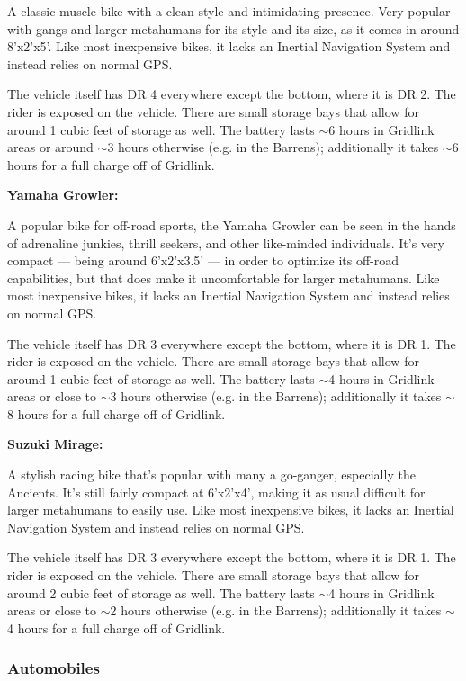 A classic muscle bike with a clean style and intimidating presence. Very popular with gangs and larger metahumans for its style and its size, as it comes in around 8'x2'x5'. Like most inexpensive bikes, it lacks an Inertial Navigation System and instead relies on normal GPS.

The vehicle itself has DR 4 everywhere except the bottom, where it is DR 2. The rider is exposed on the vehicle. There are small storage bays that allow for around 1 cubic feet of storage as well. The battery lasts $\sim$6 hours in Gridlink areas or around $\sim$3 hours otherwise (e.g. in the Barrens); additionally it takes $\sim$6 hours for a full charge off of Gridlink.

\textbf{Yamaha Growler:}

A popular bike for off-road sports, the Yamaha Growler can be seen in the hands of adrenaline junkies, thrill seekers, and other like-minded individuals. It's very compact — being around 6'x2'x3.5' — in order to optimize its off-road capabilities, but that does make it uncomfortable for larger metahumans. Like most inexpensive bikes, it lacks an Inertial Navigation System and instead relies on normal GPS.

The vehicle itself has DR 3 everywhere except the bottom, where it is DR 1. The rider is exposed on the vehicle. There are small storage bays that allow for around 1 cubic feet of storage as well. The battery lasts $\sim$4 hours in Gridlink areas or close to $\sim$3 hours otherwise (e.g. in the Barrens); additionally it takes $\sim$8 hours for a full charge off of Gridlink.

\textbf{Suzuki Mirage:}

A stylish racing bike that's popular with many a go-ganger, especially the Ancients. It's still fairly compact at 6'x2'x4', making it as usual difficult for larger metahumans to easily use. Like most inexpensive bikes, it lacks an Inertial Navigation System and instead relies on normal GPS.

The vehicle itself has DR 3 everywhere except the bottom, where it is DR 1. The rider is exposed on the vehicle. There are small storage bays that allow for around 2 cubic feet of storage as well. The battery lasts $\sim$4 hours in Gridlink areas or close to $\sim$2 hours otherwise (e.g. in the Barrens); additionally it takes $\sim$4 hours for a full charge off of Gridlink.

\subsubsection{Automobiles}

